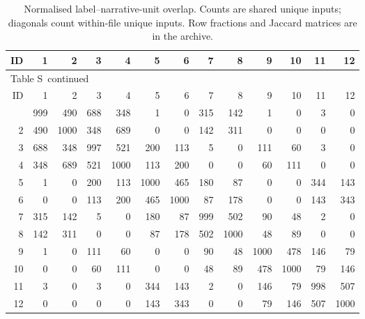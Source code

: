 \documentclass[10pt,a4paper]{article}
\renewcommand{\thetable}{S\arabic{table}}
\begin{document}
{\scriptsize
\setlength{\tabcolsep}{4pt}
\begin{longtable}{@{}rrrrrrrrrrrrr@{}}
\caption{Normalised label--narrative-unit overlap. Counts are shared unique inputs; diagonals count within-file unique inputs. Row fractions and Jaccard matrices are in the archive.}\label{sup:legacy_overlap_label_narrative_counts}\\
\toprule
ID & 1 & 2 & 3 & 4 & 5 & 6 & 7 & 8 & 9 & 10 & 11 & 12 \\
\midrule\endfirsthead
\multicolumn{13}{l}{\small Table \thetable\ continued}\\
\toprule
ID & 1 & 2 & 3 & 4 & 5 & 6 & 7 & 8 & 9 & 10 & 11 & 12 \\
\midrule\endhead
\bottomrule\endfoot
1 & 999 & 490 & 688 & 348 & 1 & 0 & 315 & 142 & 1 & 0 & 3 & 0 \\
2 & 490 & 1000 & 348 & 689 & 0 & 0 & 142 & 311 & 0 & 0 & 0 & 0 \\
3 & 688 & 348 & 997 & 521 & 200 & 113 & 5 & 0 & 111 & 60 & 3 & 0 \\
4 & 348 & 689 & 521 & 1000 & 113 & 200 & 0 & 0 & 60 & 111 & 0 & 0 \\
5 & 1 & 0 & 200 & 113 & 1000 & 465 & 180 & 87 & 0 & 0 & 344 & 143 \\
6 & 0 & 0 & 113 & 200 & 465 & 1000 & 87 & 178 & 0 & 0 & 143 & 343 \\
7 & 315 & 142 & 5 & 0 & 180 & 87 & 999 & 502 & 90 & 48 & 2 & 0 \\
8 & 142 & 311 & 0 & 0 & 87 & 178 & 502 & 1000 & 48 & 89 & 0 & 0 \\
9 & 1 & 0 & 111 & 60 & 0 & 0 & 90 & 48 & 1000 & 478 & 146 & 79 \\
10 & 0 & 0 & 60 & 111 & 0 & 0 & 48 & 89 & 478 & 1000 & 79 & 146 \\
11 & 3 & 0 & 3 & 0 & 344 & 143 & 2 & 0 & 146 & 79 & 998 & 507 \\
12 & 0 & 0 & 0 & 0 & 143 & 343 & 0 & 0 & 79 & 146 & 507 & 1000 \\
\end{longtable}
}
\end{document}
